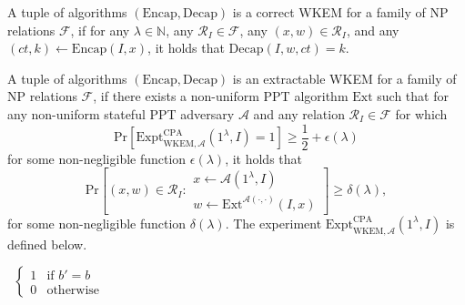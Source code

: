\begin{definition}\label{def-WKEMcorr}
    A tuple of algorithms $(\text{Encap}, \text{Decap})$ is a correct WKEM for a family of NP relations $\mathcal{F}$, if for any $\lambda \in \mathbb{N}$, any $\mathcal{R}_I \in \mathcal{F}$, any $(x, w) \in \mathcal{R}_I$, and any $(ct, k) \gets \text{Encap}(I, x)$, it holds that $\text{Decap}(I, w, ct) = k$.
\end{definition}

\begin{definition}\label{def-WKEMextract}
    A tuple of algorithms $(\text{Encap}, \text{Decap})$ is an extractable WKEM for a family of NP relations $\mathcal{F}$, if there exists a non-uniform PPT algorithm $\text{Ext}$ such that for any non-uniform stateful PPT adversary $\mathcal{A}$ and any relation $\mathcal{R}_I \in \mathcal{F}$ for which
    \begin{equation*}
        \text{Pr}[\text{Expt}^\text{CPA}_{\text{WKEM},\mathcal{A}}(1^\lambda, I) = 1] \geq \frac{1}{2} + \epsilon(\lambda)
    \end{equation*}
    for some non-negligible function $\epsilon(\lambda)$, it holds that
    \begin{equation*}
        \text{Pr}\left[
            (x, w) \in \mathcal{R}_I : 
            \begin{array}{r}
                x \gets \mathcal{A}(1^\lambda, I) \\
                w \gets \text{Ext}^{\mathcal{A}(\cdot, \cdot)}(I, x)
            \end{array}
        \right] \geq \delta(\lambda),
    \end{equation*} 
    for some non-negligible function $\delta(\lambda)$. The experiment $\text{Expt}^\text{CPA}_{\text{WKEM},\mathcal{A}}(1^\lambda, I)$ is defined below.
\end{definition}

\newsavebox{\returnOfExptWKEMCPA}
\setbox\returnOfExptWKEMCPA\hbox{
    $\begin{cases}
        1 & \text{if } b' = b \\
        0 & \text{otherwise}
    \end{cases}$
}

